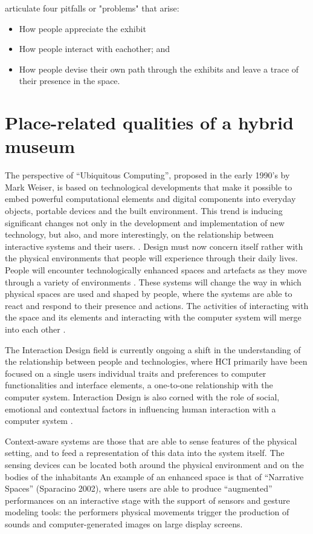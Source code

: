 \break
\autocite[p. 168]{hybridplace_ciolfi} articulate four pitfalls or "problems" that arise: 
\begin{itemize}
    \item How people appreciate the exhibit
    \item How people interact with eachother; and
    \item How people devise their own path through the exhibits and leave a trace of their presence in the space.
\end{itemize}


\section{Place-related qualities of a hybrid museum}

The perspective of “Ubiquitous Computing”, proposed in the early 1990’s by Mark Weiser, is based on technological developments that make it possible to embed powerful computational elements and digital components into everyday objects, portable devices and the built environment. This trend is inducing significant changes not only in the development and implementation of new technology, but also, and more interestingly, on the relationship between interactive systems and their users. \autocite[p. 217]{ciolfi_space_2005}. Design must now concern itself rather with the physical environments that people will experience through their daily lives. People will encounter technologically enhanced spaces and artefacts as they move through a variety of environments \autocite[p. 217]{ciolfi_space_2005}. These systems will change the way in which physical spaces are used and shaped by people, where the systems are able to react and respond to their presence and actions. The activities of interacting with the space and its elements and interacting with the computer system will merge into each other \autocite[p. 217]{ciolfi_space_2005}. 

The Interaction Design field is currently ongoing a shift in the understanding of the relationship between people and technologies, where HCI primarily have been focused on a single users individual traits and preferences to computer functionalities and interface elements, a one-to-one relationship with the computer system. Interaction Design is also corned with the role of social, emotional and contextual factors in influencing human interaction with a computer system \autocite[p. 217]{ciolfi_space_2005}.

Context-aware systems are those that are able to sense features of the physical setting, and to feed a representation of this data into the system itself. The sensing devices can be located both around the physical environment and on the bodies of the inhabitants \autocite[p. 218]{ciolfi_space_2005} An example of an enhanced space is that of “Narrative Spaces” (Sparacino 2002), where users are able to produce “augmented” performances on an interactive stage with the support of sensors and gesture modeling tools: the performers physical movements trigger the production of sounds and computer-generated images on large display screens\autocite[p. 219]{ciolfi_space_2005}. 

